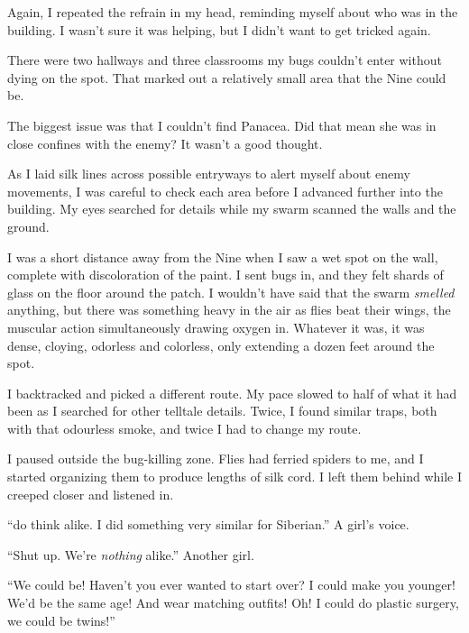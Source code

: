 Again, I repeated the refrain in my head, reminding myself about who was in the building.  I wasn't sure it was helping, but I didn't want to get tricked again.



There were two hallways and three classrooms my bugs couldn't enter without dying on the spot. That marked out a relatively small area that the Nine could be.



The biggest issue was that I couldn't find Panacea.  Did that mean she was in close confines with the enemy?  It wasn't a good thought.



As I laid silk lines across possible entryways to alert myself about enemy movements, I was careful to check each area before I advanced further into the building.  My eyes searched for details while my swarm scanned the walls and the ground.



I was a short distance away from the Nine when I saw a wet spot on the wall, complete with discoloration of the paint.  I sent bugs in, and they felt shards of glass on the floor around the patch.  I wouldn't have said that the swarm \emph{smelled} anything, but there was something heavy in the air as flies beat their wings, the muscular action simultaneously drawing oxygen in.  Whatever it was, it was dense, cloying, odorless and colorless, only extending a dozen feet around the spot.



I backtracked and picked a different route.  My pace slowed to half of what it had been as I searched for other telltale details.  Twice, I found similar traps, both with that odourless smoke, and twice I had to change my route.



I paused outside the bug-killing zone.  Flies had ferried spiders to me, and I started organizing them to produce lengths of silk cord.  I left them behind while I creeped closer and listened in.



``\ldotsminds do think alike.  I did something very similar for Siberian.''  A girl's voice.



``Shut up.  We're \emph{nothing} alike.''  Another girl.



``We could be!  Haven't you ever wanted to start over?  I could make you younger!  We'd be the same age!  And wear matching outfits!  Oh!  I could do plastic surgery, we could be twins!''




